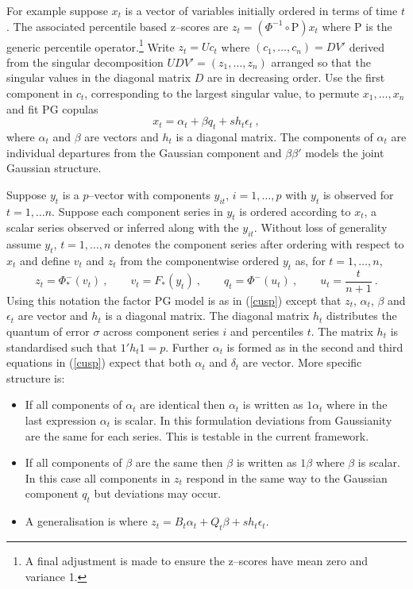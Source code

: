 \documentclass[authoryear]{elsarticle}
\newcommand{\eps}{\epsilon}
\newcommand{\eref}[1]{(\ref{#1})}
\newcommand{\cq}{\ , \qquad}
\renewcommand{\P}{\mathrm{P}}
\begin{document}
For example suppose $x_t$ is a vector of variables initially ordered in terms of time $t$.   The associated percentile based z--scores  are   $z_t= (\Phi^{-1}\circ \P) x_t$ where $\P$ is the generic percentile operator.\footnote{A final adjustment is made to ensure the z--scores have mean zero and variance 1.}   Write $z_t=Uc_t$ where $(c_1,\ldots,c_n)=DV'$ derived from the singular decomposition $UDV'=(z_1,\ldots,z_n)$ arranged so that the singular values in the diagonal matrix $D$ are in decreasing order.   Use the first component in $c_t$, corresponding to the largest singular value,  to permute $x_1,\ldots,x_n$ and fit PG copulas
$$
x_t = \alpha_t + \beta q_t + sh_t\eps_t\ ,
$$
where $\alpha_t$ and $\beta$ are vectors and $h_t$ is a diagonal matrix.  The components of $\alpha_t$ are individual departures from the Gaussian component and $\beta\beta'$ models the joint Gaussian structure.






Suppose $y_t$ is a $p$--vector with components $y_{it}$, $i=1,\ldots,p$ with $y_t$ is observed for $t=1,\ldots n$.   Suppose each component series in $y_t$ is ordered according to $x_t$, a scalar series observed or inferred along with the $y_{it}$.   Without loss of generality assume $y_t$, $t=1,\ldots,n$ denotes the component series after ordering with respect to $x_t$ and define $v_t$ and $z_t$ from the componentwise ordered $y_t$ as, for $t=1,\ldots,n$, 
$$
z_t = \Phi^-_*(v_t)\cq v_t = F_*(y_t)\cq q_t=\Phi^-(u_t)\cq u_t=\frac{t}{n+1}\ .
$$
Using this notation the factor PG model is as in \eref{cusp} except that $z_t$, $\alpha_t$, $\beta$ and $\eps_t$ are vector and $h_t$ is a diagonal matrix. The diagonal matrix $h_t$ distributes the quantum of error $\sigma$  across component series $i$ and percentiles $t$.   The matrix $h_t$ is standardised such that $1'h_t1=p$.    Further $\alpha_t$ is formed as in the second and third equations in \eref{cusp} expect that both $\alpha_t$ and $\delta_t$ are vector.    More specific structure is: 
\begin{itemize}
\item   If all components of $\alpha_t$ are identical then  $\alpha_t$ is written as $1\alpha_t$ where in the last expression $\alpha_t$ is scalar.  In this formulation deviations from Gaussianity are the same for each series.  This is testable in the current framework.
\item If all components of $\beta$ are the same then  $\beta$ is written as $1\beta$ where $\beta$ is scalar.   In this case all components in $z_t$ respond in the same way to the Gaussian component $q_t$ but deviations may occur.  
\item A generalisation is where $z_t=B_t\alpha_t + Q_t\beta + sh_t\eps_t$.

\end{itemize}
\end{document}
